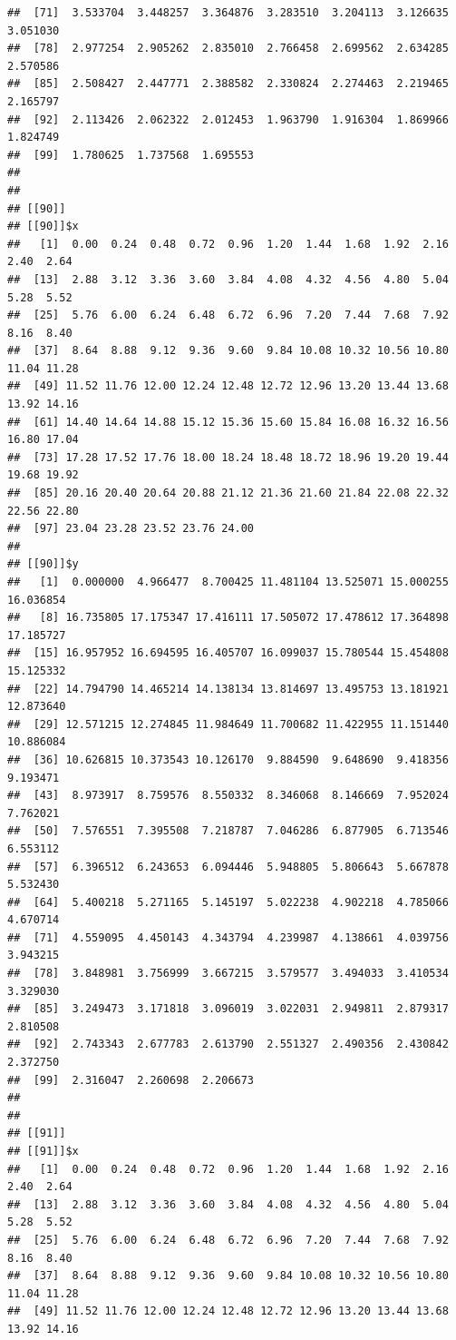 \documentclass[
  ignorenonframetext,
]{beamer}
\begin{document}
\begin{frame}[fragile]{}
\begin{verbatim}
##  [71]  3.533704  3.448257  3.364876  3.283510  3.204113  3.126635  3.051030
##  [78]  2.977254  2.905262  2.835010  2.766458  2.699562  2.634285  2.570586
##  [85]  2.508427  2.447771  2.388582  2.330824  2.274463  2.219465  2.165797
##  [92]  2.113426  2.062322  2.012453  1.963790  1.916304  1.869966  1.824749
##  [99]  1.780625  1.737568  1.695553
## 
## 
## [[90]]
## [[90]]$x
##   [1]  0.00  0.24  0.48  0.72  0.96  1.20  1.44  1.68  1.92  2.16  2.40  2.64
##  [13]  2.88  3.12  3.36  3.60  3.84  4.08  4.32  4.56  4.80  5.04  5.28  5.52
##  [25]  5.76  6.00  6.24  6.48  6.72  6.96  7.20  7.44  7.68  7.92  8.16  8.40
##  [37]  8.64  8.88  9.12  9.36  9.60  9.84 10.08 10.32 10.56 10.80 11.04 11.28
##  [49] 11.52 11.76 12.00 12.24 12.48 12.72 12.96 13.20 13.44 13.68 13.92 14.16
##  [61] 14.40 14.64 14.88 15.12 15.36 15.60 15.84 16.08 16.32 16.56 16.80 17.04
##  [73] 17.28 17.52 17.76 18.00 18.24 18.48 18.72 18.96 19.20 19.44 19.68 19.92
##  [85] 20.16 20.40 20.64 20.88 21.12 21.36 21.60 21.84 22.08 22.32 22.56 22.80
##  [97] 23.04 23.28 23.52 23.76 24.00
## 
## [[90]]$y
##   [1]  0.000000  4.966477  8.700425 11.481104 13.525071 15.000255 16.036854
##   [8] 16.735805 17.175347 17.416111 17.505072 17.478612 17.364898 17.185727
##  [15] 16.957952 16.694595 16.405707 16.099037 15.780544 15.454808 15.125332
##  [22] 14.794790 14.465214 14.138134 13.814697 13.495753 13.181921 12.873640
##  [29] 12.571215 12.274845 11.984649 11.700682 11.422955 11.151440 10.886084
##  [36] 10.626815 10.373543 10.126170  9.884590  9.648690  9.418356  9.193471
##  [43]  8.973917  8.759576  8.550332  8.346068  8.146669  7.952024  7.762021
##  [50]  7.576551  7.395508  7.218787  7.046286  6.877905  6.713546  6.553112
##  [57]  6.396512  6.243653  6.094446  5.948805  5.806643  5.667878  5.532430
##  [64]  5.400218  5.271165  5.145197  5.022238  4.902218  4.785066  4.670714
##  [71]  4.559095  4.450143  4.343794  4.239987  4.138661  4.039756  3.943215
##  [78]  3.848981  3.756999  3.667215  3.579577  3.494033  3.410534  3.329030
##  [85]  3.249473  3.171818  3.096019  3.022031  2.949811  2.879317  2.810508
##  [92]  2.743343  2.677783  2.613790  2.551327  2.490356  2.430842  2.372750
##  [99]  2.316047  2.260698  2.206673
## 
## 
## [[91]]
## [[91]]$x
##   [1]  0.00  0.24  0.48  0.72  0.96  1.20  1.44  1.68  1.92  2.16  2.40  2.64
##  [13]  2.88  3.12  3.36  3.60  3.84  4.08  4.32  4.56  4.80  5.04  5.28  5.52
##  [25]  5.76  6.00  6.24  6.48  6.72  6.96  7.20  7.44  7.68  7.92  8.16  8.40
##  [37]  8.64  8.88  9.12  9.36  9.60  9.84 10.08 10.32 10.56 10.80 11.04 11.28
##  [49] 11.52 11.76 12.00 12.24 12.48 12.72 12.96 13.20 13.44 13.68 13.92 14.16

\end{verbatim}
\end{frame}
\end{document}
